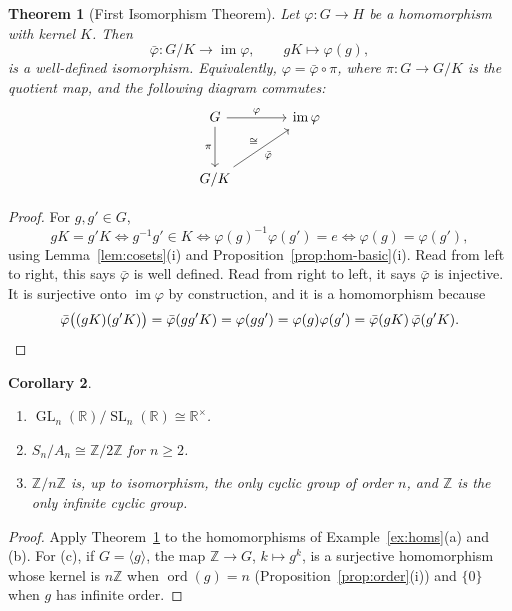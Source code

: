 \documentclass[11pt]{article}
\theoremstyle{plain}
\newtheorem{theorem}{Theorem}[section]
\newtheorem{corollary}[theorem]{Corollary}
\theoremstyle{definition}
\theoremstyle{remark}
\newcommand{\Z}{\mathbb{Z}}
\newcommand{\R}{\mathbb{R}}
\newcommand{\gen}[1]{\langle #1 \rangle}
\DeclareMathOperator{\im}{im}
\DeclareMathOperator{\GL}{GL}
\DeclareMathOperator{\SL}{SL}
\DeclareMathOperator{\ord}{ord}
\begin{document}
\begin{theorem}[First Isomorphism Theorem]\label{thm:first-iso}
Let $\varphi\colon G \to H$ be a homomorphism with kernel $K$. Then
\[
  \bar\varphi\colon G/K \to \im\varphi, \qquad gK \mapsto \varphi(g),
\]
is a well-defined isomorphism. Equivalently, $\varphi = \bar\varphi \circ \pi$, where $\pi\colon G \to G/K$ is the quotient map, and the following diagram commutes:
\[
\begin{tikzcd}[column sep=large, row sep=large]
  G \arrow[r, "\varphi"] \arrow[d, "\pi"'] & \im\varphi \\
  G/K \arrow[ru, "\bar\varphi"', "\cong"] &
\end{tikzcd}
\]
\end{theorem}

\begin{proof}
For $g, g' \in G$,
\[
  gK = g'K \iff g^{-1}g' \in K \iff \varphi(g)^{-1}\varphi(g') = e \iff \varphi(g) = \varphi(g'),
\]
using Lemma~\ref{lem:cosets}(i) and Proposition~\ref{prop:hom-basic}(i). Read from left to right, this says $\bar\varphi$ is well defined. Read from right to left, it says $\bar\varphi$ is injective. It is surjective onto $\im\varphi$ by construction, and it is a homomorphism because
\[
  \bar\varphi\bigl((gK)(g'K)\bigr) = \bar\varphi(gg'K) = \varphi(gg') = \varphi(g)\varphi(g') = \bar\varphi(gK)\,\bar\varphi(g'K). \qedhere
\]
\end{proof}

\begin{corollary}\label{cor:iso-examples}
\leavevmode
\begin{enumerate}[label=(\alph*)]
  \item $\GL_n(\R)/\SL_n(\R) \cong \R^\times$.
  \item $S_n/A_n \cong \Z/2\Z$ for $n \ge 2$.
  \item $\Z/n\Z$ is, up to isomorphism, the only cyclic group of order $n$, and $\Z$ is the only infinite cyclic group.
\end{enumerate}
\end{corollary}

\begin{proof}
Apply Theorem~\ref{thm:first-iso} to the homomorphisms of Example~\ref{ex:homs}(a) and (b). For (c), if $G = \gen{g}$, the map $\Z \to G$, $k \mapsto g^k$, is a surjective homomorphism whose kernel is $n\Z$ when $\ord(g) = n$ (Proposition~\ref{prop:order}(i)) and $\{0\}$ when $g$ has infinite order.
\end{proof}
\end{document}
